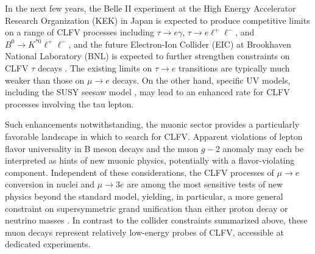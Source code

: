 \documentclass[12pt,letterpaper]{book}
\begin{document}
In the next few years, the Belle II experiment \cite{Belle-II:2018jsg} at the High Energy Accelerator Research Organization (KEK) in Japan is expected to produce competitive limits on a range of CLFV processes including $\tau\rightarrow e\gamma$, $\tau\rightarrow e\ell^+\ell^-$, and $B^0\rightarrow K^{*0}\ell^+\ell^-$, and the future Electron-Ion Collider (EIC) \cite{AbdulKhalek:2022erw} at Brookhaven National Laboratory (BNL) is expected to further strengthen constraints on CLFV $\tau$ decays \cite{Cirigliano:2021img}. The existing limits on $\tau\rightarrow e$ transitions are typically much weaker than those on $\mu\rightarrow e$ decays. On the other hand, specific UV models, including the SUSY seesaw model \cite{Ellis:1999uq}, may lead to an enhanced rate for CLFV processes involving the tau lepton.

Such enhancements notwithstanding, the muonic sector provides a particularly favorable landscape in which to search for CLFV. Apparent violations of lepton flavor universality in B meson decays \cite{LHCb:2021trn} and the muon $g-2$ anomaly \cite{Muong-2:2021ojo} may each be interpreted as hints of new muonic physics, potentially with a flavor-violating component. Independent of these considerations, the CLFV processes of $\mu\rightarrow e$ conversion in nuclei and $\mu\rightarrow 3e$ are among the most sensitive tests of new physics beyond the standard model, yielding, in particular, a more general constraint on supersymmetric grand unification than either proton decay or neutrino masses \cite{Barbieri_1994}.  In contrast to the collider constraints summarized above, these muon decays represent relatively low-energy probes of CLFV, accessible at dedicated experiments.
\end{document}
